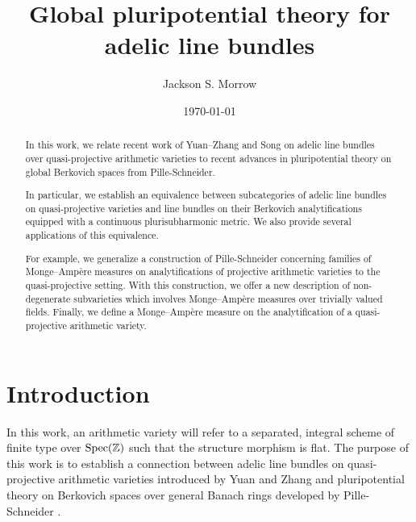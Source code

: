 \documentclass[11pt,reqno]{amsart}
\newcommand{\mZ}{\mathbb{Z}}
\theoremstyle{theorem}
\numberwithin{equation}{subsection}
\numberwithin{equation}{subsection}
\theoremstyle{definition}
\theoremstyle{remark}
\numberwithin{equation}{subsubsection} \numberwithin{figure}{section}
\begin{document}
\title{Global pluripotential theory for adelic line bundles}	


\author{Jackson S. Morrow}
\address{Jackson S. Morrow \\
	Department of Mathematics\\
	University of North Texas \\
	Denton, TX 76203, USA}


\begin{abstract}
In this work, we relate recent work of Yuan--Zhang and Song on adelic line bundles over quasi-projective arithmetic varieties to recent advances in pluripotential theory on global Berkovich spaces from Pille-Schneider. 


In particular, we establish an equivalence between subcategories of adelic line bundles on quasi-projective varieties and line bundles on their Berkovich analytifications equipped with a continuous plurisubharmonic metric. 
We also provide several applications of this equivalence.


For example, we generalize a construction of Pille-Schneider concerning families of Monge--Amp\`ere measures on analytifications of projective arithmetic varieties to the quasi-projective setting. 
With this construction, we offer a new description of non-degenerate subvarieties which involves Monge--Amp\`ere measures over trivially valued fields. 
Finally, we define a Monge--Amp\`ere measure on the analytification of a quasi-projective arithmetic variety. 
\end{abstract}


	

\date{\today}
\maketitle

\tableofcontents

\section{Introduction}
In this work, an arithmetic variety will refer to a separated, integral scheme of finite type over $\Spec(\mZ)$ such that the structure morphism is flat.  
The purpose of this work is to establish a connection between adelic line bundles on quasi-projective arithmetic varieties introduced by Yuan and Zhang \cite{YuanZhang:AdelicLineBundles} and pluripotential theory on Berkovich spaces over general Banach rings developed by Pille-Schneider \cite{PilleSchneider:Global}. 
\end{document}
